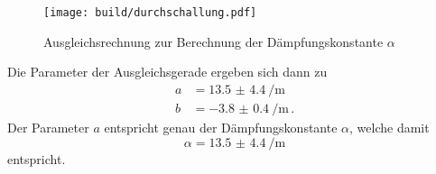 \begin{figure}
    \centering
    \texttt{[image: build/durchschallung.pdf]}
    \caption{Ausgleichsrechnung zur Berechnung der Dämpfungskonstante $\alpha$}
    \label{fig:alpha}
\end{figure}

Die Parameter der Ausgleichsgerade ergeben sich dann zu 
\begin{align}
    a &= \SI{13.5(44)}{\per\metre} \\
    b &= \SI{-3.8(04)}{\per\metre}\,.
\end{align}
Der Parameter $a$ entspricht genau der Dämpfungskonstante $\alpha$, welche damit 
\begin{equation}
    \alpha = \SI{13.5(44)}{\per\m}
\end{equation}
entspricht. 
